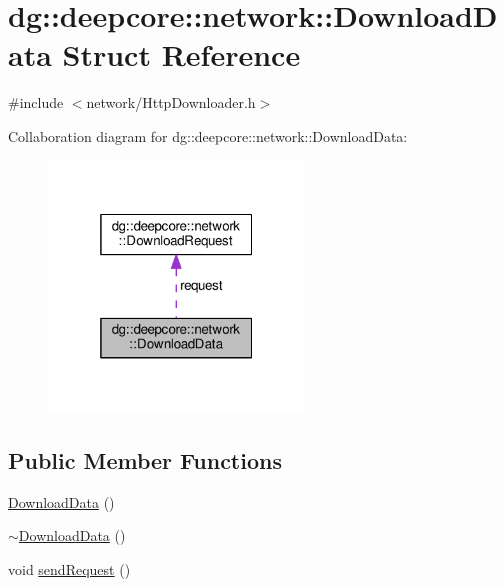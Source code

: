 \hypertarget{structdg_1_1deepcore_1_1network_1_1_download_data}{}\section{dg\+:\+:deepcore\+:\+:network\+:\+:Download\+Data Struct Reference}
\label{structdg_1_1deepcore_1_1network_1_1_download_data}


{\ttfamily \#include $<$network/\+Http\+Downloader.\+h$>$}



Collaboration diagram for dg\+:\+:deepcore\+:\+:network\+:\+:Download\+Data\+:
\nopagebreak
\begin{figure}[H]
\begin{center}
\leavevmode
\includegraphics[width=193pt]{structdg_1_1deepcore_1_1network_1_1_download_data__coll__graph}
\end{center}
\end{figure}
\subsection*{Public Member Functions}
\begin{DoxyCompactItemize}
\item 
\hyperlink{structdg_1_1deepcore_1_1network_1_1_download_data_ac04e654bffde01b5b0701d617bbae59c}{Download\+Data} ()
\item 
\hyperlink{structdg_1_1deepcore_1_1network_1_1_download_data_aab6801db8554507cdd5752d943e6701d}{$\sim$\+Download\+Data} ()
\item 
void \hyperlink{structdg_1_1deepcore_1_1network_1_1_download_data_a7540a749fcfe1012a4b98387e3f04c8c}{send\+Request} ()
\end{DoxyCompactItemize}
